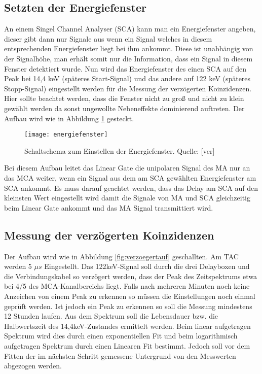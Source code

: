 \subsection{Setzten der Energiefenster}
An einem Singel Channel Analyser (SCA) kann man ein Energiefenster angeben, dieser gibt dann nur Signale aus wenn ein Signal welches in diesem entsprechenden Energiefenster liegt bei ihm ankommt. Diese ist unabhängig von der Signalhöhe, man erhält somit nur die Information, dass ein Signal in diesem Fenster detektiert wurde. Nun wird das Energiefenster des einen SCA auf den Peak bei 14,4 keV (späteres Start-Signal) und das andere auf 122 keV (späteres Stopp-Signal) eingestellt werden für die Messung der verzögerten Koinzidenzen. Hier sollte beachtet werden, dass die Fenster nicht zu groß und nicht zu klein gewählt werden da sonst ungewollte Nebeneffekte dominierend auftreten. Der Aufbau wird wie in Abbildung \ref{fig:energiefenster} gesteckt.
\begin{figure}[h]
\begin{center}
\texttt{[image: energiefenster]}
\caption{Schaltschema zum Einstellen der Energiefenster. Quelle: [ver]}
\label{fig:energiefenster}
\end{center}
\end{figure}
Bei diesem Aufbau leitet das Linear Gate die unipolaren Signal des MA nur an das MCA weiter, wenn ein Signal aus dem am SCA gewählten Energiefenster am SCA ankommt. Es muss darauf geachtet werden, dass das Delay am SCA auf den kleinsten Wert eingestellt wird damit die Signale von MA und SCA gleichzeitig beim Linear Gate ankommt und das MA Signal transmittiert wird.
\subsection{Messung der verzögerten Koinzidenzen}
Der Aufbau wird wie in Abbildung \ref*{fig:verzoegertauf} geschallten. Am TAC werden 5 $\mu s$ Eingestellt. Das 122keV-Signal soll durch die drei Delayboxen und die Verbindungskabel so verzögert werden, dass der Peak des Zeitspektrums etwa bei 4/5 des MCA-Kanalbereichs liegt. Falls nach mehreren Minuten noch keine Anzeichen von einem Peak zu erkennen so müssen die Einstellungen noch einmal geprüft werden. Ist jedoch ein Peak zu erkennen so soll die Messung mindestens 12 Stunden laufen. 
Aus dem Spektrum soll die Lebensdauer bzw. die Halbwertszeit des 14,4keV-Zustandes ermittelt werden. Beim linear aufgetragen Spektrum wird dies durch einen exponentiellen Fit und beim logarithmisch aufgetragen Spektrum durch einen Linearen Fit bestimmt. Jedoch soll vor dem Fitten der im nächsten Schritt gemessene Untergrund von den Messwerten abgezogen werden. 

